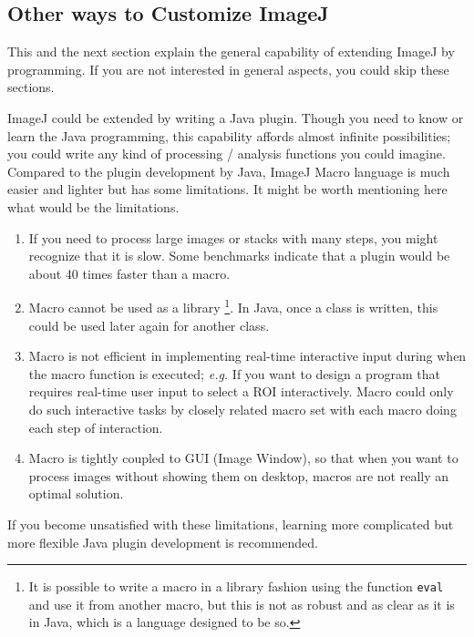 \documentclass[11pt,a4paper,oneside]{report}
\newcommand{\ilcom}[1]{\texttt{\small#1}}
\begin{document}
\subsection{Other ways to Customize ImageJ}

This and the next section explain the general capability of extending ImageJ by programming. If you are not interested in general aspects, you could skip these sections.  

ImageJ could be extended by writing a Java plugin. Though you need to know or learn the Java programming,  this capability affords almost infinite possibilities;  you could write any kind of processing / analysis functions you could imagine. Compared to the plugin development by Java, ImageJ Macro language is much easier and lighter but has some limitations. It might be worth mentioning here what would be the limitations. 

\begin{enumerate}
\item If you need to process large images or stacks with many steps, 
you might recognize that it is slow. Some benchmarks indicate that a plugin would be about 40 times faster than a macro. 

\item Macro cannot be used as a library
  \footnote{It is possible to write a macro in a library fashion using the function \ilcom{eval} and use it from another macro, 
but this is not as robust and as clear as it is in Java, which is a language designed to be so.}. 
In Java, once a class is written, this could be used later again for another class. 

\item Macro is not efficient in implementing real-time interactive input 
during when the macro function is executed; 
\textit{e.g.} If you want to design a program that requires real-time user input 
to select a ROI interactively.  
Macro could only do such interactive tasks by closely related macro set with each macro doing each step of interaction. 

\item Macro is tightly coupled to GUI (Image Window), so that when you want to process images without showing them on desktop, macros are not really an optimal solution.
\end{enumerate}

If you become unsatisfied with these limitations, 
learning more complicated but more flexible Java plugin development is recommended. 
\end{document}
